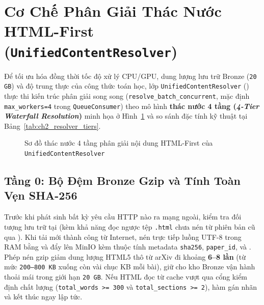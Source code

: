 
\section{Cơ Chế Phân Giải Thác Nước HTML-First (\texttt{UnifiedContentResolver})}
\label{sec:ch2_resolver}

Để tối ưu hóa đồng thời tốc độ xử lý CPU/GPU, dung lượng lưu trữ Bronze (\texttt{20 GB}) và độ trung thực của công thức toán học, lớp \texttt{UnifiedContentResolver} () thực thi kiến trúc phân giải song song (\texttt{resolve\_batch\_concurrent}, mặc định \texttt{max\_workers=4} trong \texttt{QueueConsumer}) theo mô hình \textbf{thác nước 4 tầng (\textit{4-Tier Waterfall Resolution})} minh họa ở Hình~\ref{fig:content_resolver} và so sánh đặc tính kỹ thuật tại Bảng~\ref{tab:ch2_resolver_tiers}.

\begin{figure}[htbp]
  \centering
  \DrawContentResolverWaterfall
  \caption[Sơ đồ thác nước bốn tầng phân giải nội dung HTML-First]{Sơ đồ thác nước 4 tầng phân giải nội dung HTML-First của \texttt{UnifiedContentResolver}}
  \label{fig:content_resolver}
\end{figure}

\subsection{Tầng 0: Bộ Đệm Bronze Gzip và Tính Toàn Vẹn SHA-256}
\label{sec:ch2_tier0_cache}

Trước khi phát sinh bất kỳ yêu cầu HTTP nào ra mạng ngoài,  kiểm tra đối tượng lưu trữ tại  (kèm khả năng đọc ngược tệp \texttt{.html} chưa nén từ phiên bản cũ qua ). Khi tải mới thành công từ Internet,  nén trực tiếp luồng UTF-8 trong RAM bằng  và đẩy lên MinIO kèm thuộc tính metadata \texttt{sha256}, \texttt{paper\_id}, và . Phép nén gzip giảm dung lượng HTML5 thô từ arXiv đi khoảng \textbf{6--8 lần} (từ mức \texttt{200--800 KB} xuống còn vài chục KB mỗi bài), giữ cho kho Bronze vận hành thoải mái trong giới hạn \texttt{20 GB}. Nếu HTML đọc từ cache vượt qua cổng kiểm định chất lượng (\texttt{total\_words >= 300} và \texttt{total\_sections >= 2}), hàm gán nhãn  và kết thúc ngay lập tức.

